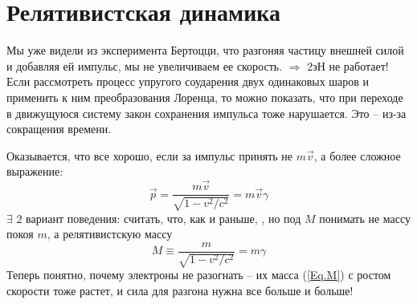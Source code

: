 \section{Релятивистская динамика}   

   Мы уже видели из эксперимента Бертоцци, что разгоняя частицу внешней силой и добавляя ей импульс, мы не увеличиваем ее скорость. $\Rightarrow$ 2зН не работает!
   Если рассмотреть процесс упругого соударения двух одинаковых шаров и применить к ним преобразования Лоренца, то можно показать, что при переходе в движущуюся систему закон сохранения импульса тоже нарушается. Это -- из-за сокращения времени.

   Оказывается, что все хорошо, если за импульс принять не $m\vec{v}$, а более сложное выражение:
  \begin{equation}
  \vec{p}=\frac{m\vec{v}}{\sqrt{1-v^2/c^2}} =m\vec{v}\gamma
  \end{equation}
   $\exists$ 2 вариант поведения: считать, что, как и раньше, , но под  $M$ понимать не массу покоя $m$, а релятивистскую массу
  \begin{equation}\label{Eq.M}
  M\equiv\frac{m}{\sqrt{1-v^2/c^2}} =m\gamma
  \end{equation}
Теперь понятно, почему электроны не разогнать -- их масса (\ref{Eq.M}) с ростом скорости тоже растет, и сила для разгона нужна все больше и больше!

